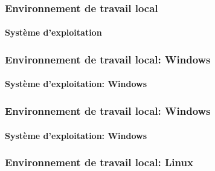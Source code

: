 \documentclass{beamer}
\begin{document}
\begin{frame}
\frametitle{Environnement de travail local}
\framesubtitle{Système d'exploitation}



\end{frame}

\begin{frame}
\frametitle{Environnement de travail local: Windows}
\framesubtitle{Système d'exploitation: Windows}

\end{frame}

\begin{frame}
\frametitle{Environnement de travail local: Windows}
\framesubtitle{Système d'exploitation: Windows}

\end{frame}

\begin{frame}
\frametitle{Environnement de travail local: Linux}

\end{frame}
\end{document}

